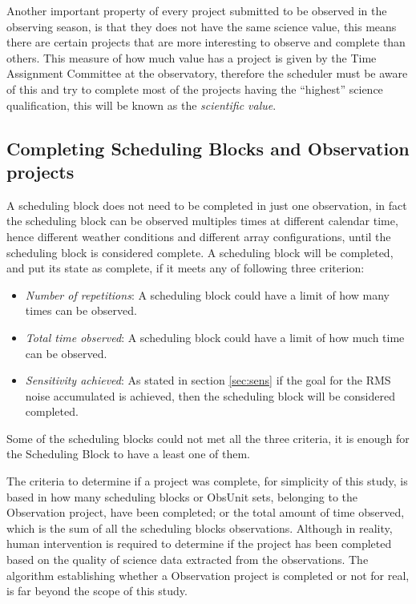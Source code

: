 Another important property of every project submitted to be observed in the observing season, is that they does not have the same science value, this means there are certain projects that are more interesting to observe and complete than others. This measure of how much value has a project is given by the Time Assignment Committee at the observatory, therefore the scheduler must be aware of this and try to complete most of the projects having the ``highest'' science qualification, this will be known as the \textit{scientific value}.

\subsection{Completing Scheduling Blocks and Observation projects}
\label{subsec:completing-obs}
A scheduling block does not need to be completed in just one observation, in fact the scheduling block can be observed multiples times at different calendar time, hence different weather conditions and different array configurations, until the scheduling block is considered complete.
A scheduling block will be completed, and put its state as complete, if it meets any of following three criterion:
\begin{itemize}
	\item \textit{Number of repetitions}: A scheduling block could have a limit of how many times can be observed.
	\item \textit{Total time observed}: A scheduling block could have a limit of how much time can be observed.
	\item \textit{Sensitivity achieved}: As stated in section \ref{sec:sens} if the goal for the RMS noise accumulated is achieved, then the scheduling block will be considered completed.
\end{itemize} 
Some of the scheduling blocks could not met all the three criteria, it is enough for the Scheduling Block to have a least one of them.

The criteria to determine if a project was complete, for simplicity of this study, is based in how many scheduling blocks or ObsUnit sets, belonging to the Observation project, have been completed; or the total amount of time observed, which is the sum of all the scheduling blocks observations. Although in reality, human intervention is required to determine if the project has been completed based on the quality of science data extracted from the observations. The algorithm establishing whether a Observation project is completed or not for real, is far beyond the scope of this study. 

